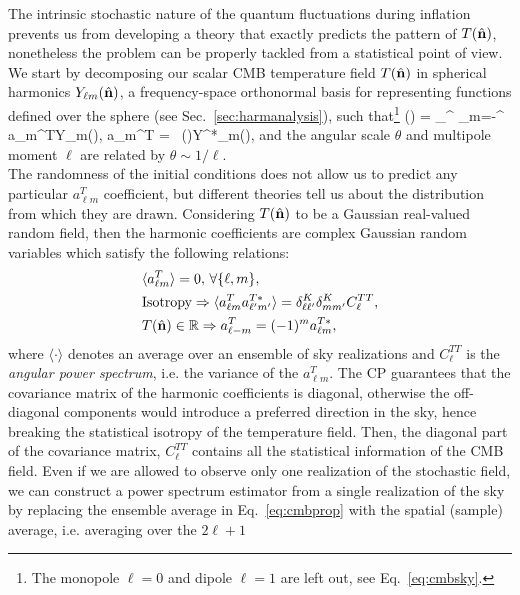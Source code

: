 The intrinsic stochastic nature of the quantum fluctuations during inflation prevents us from developing
a theory that exactly predicts the pattern of $T(\hat{\mathbf{n}})$, nonetheless the problem can be properly
tackled from a statistical point of view. We start by decomposing our scalar \gls{CMB} temperature field 
$T(\hat{\mathbf{n}})$ in spherical harmonics $Y_{\ell m}(\hat{\mathbf{n}})$, a frequency-space orthonormal 
basis for representing functions defined over the sphere (see Sec.~\eqref{sec:harmanalysis}), such that\footnote{The 
monopole $\ell=0$ and dipole $\ell=1$ are left out, see Eq.~\eqref{eq:cmbsky}.}
%
\be
\Theta(\nver) = \sum_{}^{\infty} \sum_{m=-\ell}^{\ell} a_{\ell m}^{T}Y_{\ell m}(\nver), \quad {}
\quad a_{\ell m}^{T} = \int \diff\Omega\, \Theta(\nver)Y^*_{\ell m}(\nver),
\ee
%
and the angular scale $\theta$ and multipole moment $\ell$ are related by $\theta \sim 1/\ell$.\\
The randomness of the initial conditions does not allow us to predict any particular $a_{\ell m}^T$ 
coefficient, but different theories tell us about the distribution from which they are drawn.
Considering $T(\hat{\mathbf{n}})$ to be a Gaussian real-valued random field, then the harmonic coefficients 
are complex Gaussian random variables which satisfy the following relations:
%
\begin{align}
\label{eq:cmbprop}
&\langle a_{\ell m}^T \rangle = 0, \, \forall \{\ell, m \}, \\
&\text{Isotropy} \Rightarrow \langle a_{\ell m}^T a_{\ell' m'}^{T*} \rangle = \delta^K_{\ell\ell'}\delta^K_{mm'}C_{\ell}^{TT},\\
&T(\hat{\mathbf{n}})\in \mathbb{R} \Rightarrow a_{\ell-m}^T = (-1)^m a_{\ell m}^{T*},
\end{align}
%
where $\langle\cdot\rangle$ denotes an average over an ensemble of sky realizations and $C_{\ell}^{TT}$ 
is the \emph{angular power spectrum}, i.e. the variance of the $a_{\ell m}^T$. The CP guarantees that the 
covariance matrix of the harmonic coefficients is diagonal, otherwise the off-diagonal components would
introduce a preferred direction in the sky, hence breaking the statistical isotropy of the temperature field.
Then, the diagonal part of the covariance matrix, $C_{\ell}^{TT}$ contains all the statistical information of 
the \gls{CMB} field. Even if we are allowed to observe only one realization of the stochastic field, we can
construct a power spectrum estimator from a single realization of the sky by replacing the ensemble 
average in Eq.~\eqref{eq:cmbprop} with the spatial (sample) average, i.e. averaging over the $2\ell+1$ 
